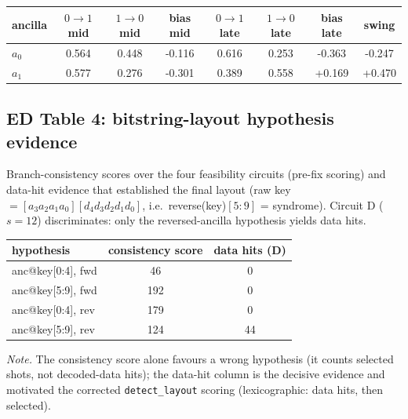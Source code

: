\documentclass[10pt,a4paper]{article}
\begin{document}
\vspace{4pt}\noindent\begin{tabular}{lccccccc}
\toprule ancilla & $0\to1$ mid & $1\to0$ mid & bias mid & $0\to1$ late & $1\to0$ late & bias late & swing \\
\midrule
$a_0$ & 0.564 & 0.448 & -0.116 & 0.616 & 0.253 & -0.363 & -0.247 \\
$a_1$ & 0.577 & 0.276 & -0.301 & 0.389 & 0.558 & +0.169 & +0.470 \\
\bottomrule\end{tabular}

\subsection*{ED Table 4: bitstring-layout hypothesis evidence}
Branch-consistency scores over the four feasibility circuits (pre-fix
scoring) and data-hit evidence that established the final layout
(raw key $=[a_3a_2a_1a_0][d_4d_3d_2d_1d_0]$, i.e.\ reverse(key)$[5{:}9]$ =
syndrome). Circuit D ($s=12$) discriminates: only the reversed-ancilla
hypothesis yields data hits.
\begin{tabular}{lcc}
\toprule hypothesis & consistency score & data hits (D) \\ \midrule
anc@key[0:4], fwd  & 46  & 0 \\
anc@key[5:9], fwd  & 192 & 0 \\
anc@key[0:4], rev  & 179 & 0 \\
anc@key[5:9], rev  & 124 & 44 \\
\bottomrule\end{tabular}

\vspace{6pt}\noindent\emph{Note.} The consistency score alone favours a
wrong hypothesis (it counts selected shots, not decoded-data hits); the
data-hit column is the decisive evidence and motivated the corrected
\texttt{detect\_layout} scoring (lexicographic: data hits, then selected).
\end{document}
